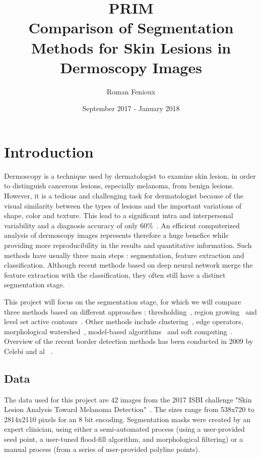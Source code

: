 \documentclass[a4paper,10pt]{article}
\title{PRIM\\ Comparison of Segmentation Methods for Skin Lesions in Dermoscopy Images}
\author{Roman Fenioux}
\date{September 2017 - January 2018}
\begin{document}
\maketitle
\newpage
\section*{Introduction}
Dermoscopy is a technique used by dermatologist to examine skin lesion, in order to distinguish cancerous lesions, especially melanoma, from benign lesions. However, it is a tedious and challenging task for dermatologist because of the visual similarity between the types of lesions and the important variations of shape, color and texture. This lead to a significant intra and interpersonal variability and a diagnosis accuracy of only 60\%~\cite{kittler_diagnostic_2002}. An efficient computerized analysis of dermoscopy images represents therefore a huge benefice while providing more reproducibility in the results and quantitative information. Such methods have usually three main steps : segmentation, feature extraction and classification. Although recent methods based on deep neural network merge the feature extraction with the classification, they often still have a distinct segmentation stage. 

This project will focus on the segmentation stage, for which we will compare three methods based on different approaches : thresholding~\cite{Garnavi2010}, region growing~\cite{celebi_border_2008} and level set active contours~\cite{li2010distance}. Other methods include clustering~\cite{gomez_independent_2008}, edge operators, morphological watershed~\cite{schmid_lesion_1999}, model-based algorithms~\cite{gao_segmentation_1998} and soft computing~\cite{yu_automated_2017}.
Overview of the recent border detection methods has been conducted in 2009 by Celebi and al ~\cite{celebi_lesion_2009}.

\subsection*{Data}

The data used for this project are 42 images from the 2017 ISBI challenge "Skin Lesion Analysis Toward Melanoma Detection"~\cite{codella_skin_2017}. The sizes range from 538x720 to 2814x2110 pixels for an 8 bit encoding. Segmentation masks were created by an expert clinician, using either a semi-automated process (using a user-provided seed point, a user-tuned flood-fill algorithm, and morphological filtering) or a manual process (from a series of user-provided polyline points). 
\end{document}
